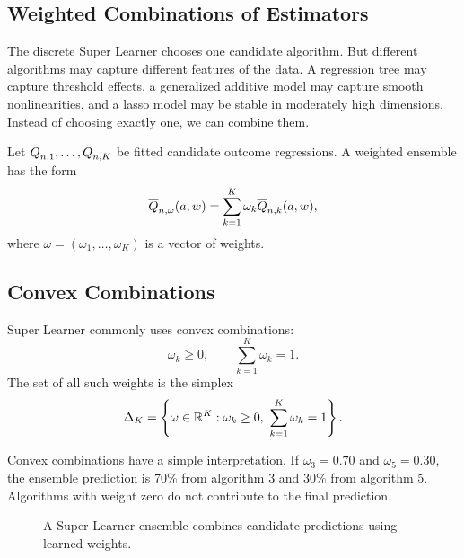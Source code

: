 \label{lec:5-6}

\subsection{Weighted Combinations of Estimators}

The discrete Super Learner chooses one candidate algorithm. But different algorithms
may capture different features of the data. A regression tree may capture threshold
effects, a generalized additive model may capture smooth nonlinearities, and a lasso
model may be stable in moderately high dimensions. Instead of choosing exactly one,
we can combine them.

Let $\overline{Q}_{n,1},\ldots,\overline{Q}_{n,K}$ be fitted candidate outcome regressions. A
weighted ensemble has the form
\[
\overline{Q}_{n,\omega}(a,w)
=
\sum_{k=1}^K \omega_k \overline{Q}_{n,k}(a,w),
\]
where $\omega=(\omega_1,\ldots,\omega_K)$ is a vector of weights.

\subsection{Convex Combinations}

Super Learner commonly uses convex combinations:
\[
\omega_k\ge 0,\qquad \sum_{k=1}^K\omega_k=1.
\]
The set of all such weights is the simplex
\[
\Delta_K=\left\{\omega\in\R^K:\omega_k\ge 0,\ \sum_{k=1}^K\omega_k=1\right\}.
\]

Convex combinations have a simple interpretation. If $\omega_3=0.70$ and
$\omega_5=0.30$, the ensemble prediction is 70\% from algorithm 3 and 30\% from
algorithm 5. Algorithms with weight zero do not contribute to the final prediction.

\begin{figure}[H]
\centering
{}
\caption{A Super Learner ensemble combines candidate predictions using learned weights.}
\label{fig:ch5-ensemble}
\end{figure}

